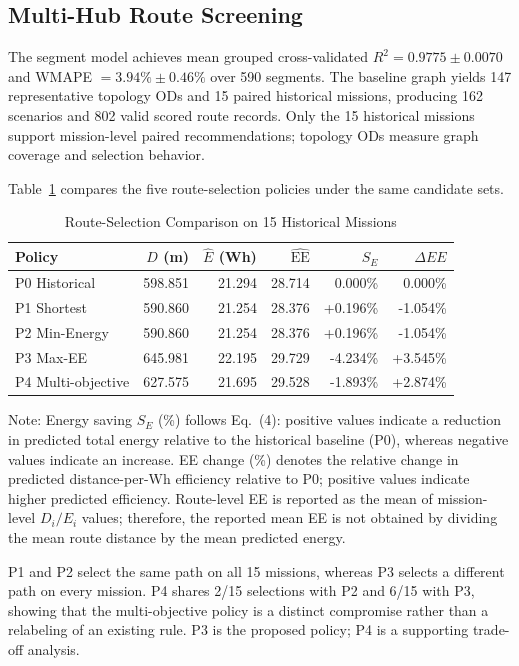 \documentclass[conference,a4paper]{IEEEtran}
\begin{document}
\subsection{Multi-Hub Route Screening}
The segment model achieves mean grouped cross-validated $R^2=0.9775\pm0.0070$ and WMAPE $=3.94\%\pm0.46\%$ over 590 segments. The baseline graph yields 147 representative topology ODs and 15 paired historical missions, producing 162 scenarios and 802 valid scored route records. Only the 15 historical missions support mission-level paired recommendations; topology ODs measure graph coverage and selection behavior.

Table~\ref{tab:route_policies} compares the five route-selection policies
under the same candidate sets.

\begin{table}[H]
\caption{Route-Selection Comparison on 15 Historical Missions}
\label{tab:route_policies}
\centering
\scriptsize
\setlength{\tabcolsep}{1.8pt}
\begin{tabular}{lrrrrr}
\toprule
Policy & $D$ (m) & $\widehat{E}$ (Wh) & $\widehat{\mathrm{EE}}$ &
$S_E$ & $\Delta EE$ \\
\midrule
P0 Historical & 598.851 & 21.294 & 28.714 & 0.000\% & 0.000\% \\
P1 Shortest & 590.860 & 21.254 & 28.376 & +0.196\% & -1.054\% \\
P2 Min-Energy & 590.860 & 21.254 & 28.376 & +0.196\% & -1.054\% \\
P3 Max-EE & 645.981 & 22.195 & 29.729 & -4.234\% & +3.545\% \\
P4 Multi-objective & 627.575 & 21.695 & 29.528 & -1.893\% & +2.874\% \\
\bottomrule
\end{tabular}
\begin{flushleft}
\scriptsize
Note: Energy saving $S_E$ (\%) follows Eq.~(4): positive values indicate
a reduction in predicted total energy relative to the historical baseline
(P0), whereas negative values indicate an increase. EE change (\%) denotes
the relative change in predicted distance-per-Wh efficiency relative to P0;
positive values indicate higher predicted efficiency. Route-level EE is
reported as the mean of mission-level $D_i/E_i$ values; therefore, the
reported mean EE is not obtained by dividing the mean route distance by the
mean predicted energy.
\end{flushleft}
\end{table}

P1 and P2 select the same path on all 15 missions, whereas P3 selects a different path on every mission. P4 shares 2/15 selections with P2 and 6/15 with P3, showing that the multi-objective policy is a distinct compromise rather than a relabeling of an existing rule. P3 is the proposed policy; P4 is a supporting trade-off analysis.
\end{document}
